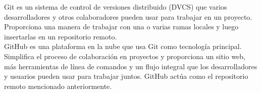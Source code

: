 
Git es un sistema de control de versiones distribuido (DVCS) que varios desarrolladores y otros colaboradores pueden usar
para trabajar en un proyecto. Proporciona una manera de trabajar con una o varias ramas locales y luego insertarlas en un repositorio remoto.\\

GitHub es una plataforma en la nube que usa Git como tecnología principal. Simplifica el proceso de colaboración en
proyectos y proporciona un sitio web, más herramientas de línea de comandos y un flujo integral que los desarrolladores
y usuarios pueden usar para trabajar juntos. GitHub actúa como el repositorio remoto mencionado anteriormente.


